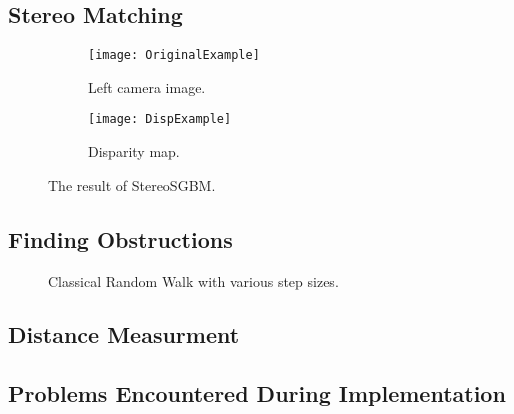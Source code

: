 \subsection{Stereo Matching}

\begin{figure}
\centering
 \begin{subfigure}[b]{0.45\textwidth}
        \texttt{[image: OriginalExample]}
        \caption{Left camera image.}
        \label{fig:OriginalExample}
    \end{subfigure}
    \begin{subfigure}[b]{0.45\textwidth}
        \texttt{[image: DispExample]}
        \caption{Disparity map.}
        \label{fig:DispExample}
    \end{subfigure}
    \caption{\label{fig:StereoMatching}The result of StereoSGBM.}
\end{figure}

\subsection{Finding Obstructions}

\begin{wrapfigure}{r}{0.4\textwidth}
\centering
{}\par\medskip
{}\par\medskip        
{}
\caption{Classical Random Walk with various step sizes.}
\label{TS}
\end{wrapfigure}

\subsection{Distance Measurment}

\subsection{Problems Encountered During Implementation }